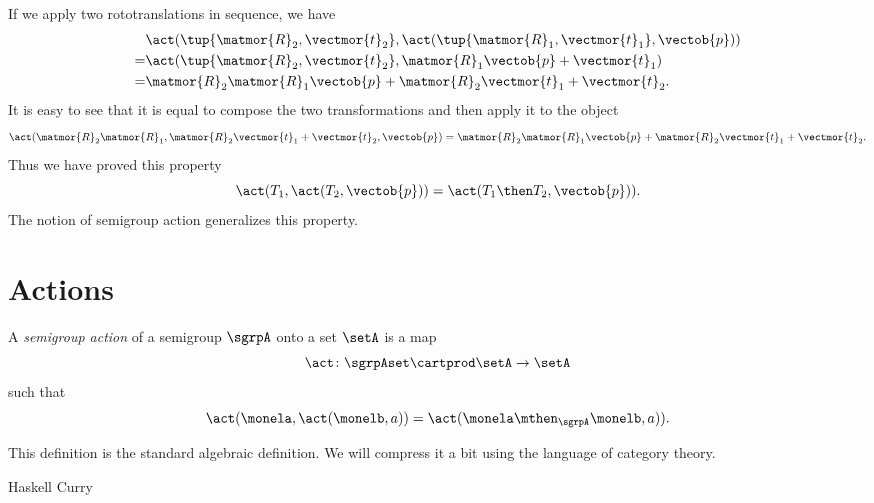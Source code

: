 If we apply two rototranslations in sequence, we have
\begin{equation}
  \begin{aligned}
& \act(\tup{\matmor{R}_2, \vectmor{t}_2}, \act(\tup{\matmor{R}_1, \vectmor{t}_1}, \vectob{p})) \\
= & \act(\tup{\matmor{R}_2, \vectmor{t}_2}, \matmor{R}_1\vectob{p} + \vectmor{t}_1) \\
= & \matmor{R}_2\matmor{R}_1\vectob{p} + \matmor{R}_2\vectmor{t}_1 + \vectmor{t}_2.
  \end{aligned}
\end{equation}
It is easy to see that it is equal to compose the two transformations and then apply it to the object
\begin{equation}
\act({\matmor{R}_2 \matmor{R}_1, \matmor{R}_2 \vectmor{t}_1 + \vectmor{t}_2}, \vectob{p})
= \matmor{R}_2\matmor{R}_1\vectob{p} + \matmor{R}_2\vectmor{t}_1 + \vectmor{t}_2 .
\end{equation}
Thus we have proved this property
\begin{equation}
\act(T_1, \act(T_2, \vectob{p})) = \act(T_1 \then T_2, \vectob{p})) .
\end{equation}
The notion of semigroup action generalizes this property.

\section{Actions}

\begin{ctdefinition}\label{def:semigroup-action-prelim}
  A \emph{semigroup action} of a semigroup $\sgrpA$ onto a set $\setA$ is a map
  \begin{equation}\label{eq:act1}
    \act \colon \sgrpAset \cartprod \setA \to \setA
  \end{equation}
  such that
  \begin{equation}\label{eq:act1cond}
    \act(\monela, \act(\monelb, a)) = \act(\monela \mthen_\sgrpA \monelb, a)).
  \end{equation}
\end{ctdefinition}

This definition is the standard algebraic definition.
We will compress it a bit using the language of category theory.

\begin{marginfigure}
Haskell Curry
\end{marginfigure}

